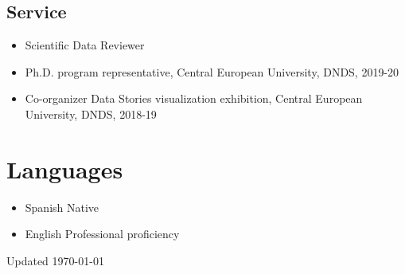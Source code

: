 \documentclass{academiccv}
\begin{document}
\subsection*{Service}
\begin{itemize}
	\item Scientific Data Reviewer
	\item Ph.D. program representative, Central European University, DNDS, 2019-20
	\item Co-organizer Data Stories visualization exhibition, Central European University, DNDS, 2018-19
\end{itemize}


\section*{Languages}
\begin{itemize}
	\item Spanish \tab Native
	\item English \tab Professional proficiency
\end{itemize}

\begin{center}
\vspace{6em}
Updated \monthyeardate\today
\end{center}
\end{document}
